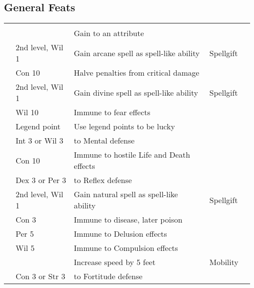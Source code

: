 \subsection{General Feats}
\begin{longtabuwrapper}
    \begin{longtabu}{>{\lcol}p{10em} >{\lcol}p{15em} >{\lcol}X >{\lcol}p{8em} >{\lcol}p{3em}}
         &  &  &  &  \\
         & \x & Gain  to an attribute           & \x &  \\
         & 2nd level, Wil 1 & Gain arcane spell as spell-like ability & Spellgift &  \\
         & Con 10 & Halve penalties from critical damage         & \x &  \\
         & 2nd level, Wil 1 & Gain divine spell as spell-like ability & Spellgift &  \\
         & Wil 10 & Immune to fear effects                      & \x &  \\
         & Legend point & Use legend points to be lucky  & \x &  \\
         & Int 3 or Wil 3 &  to Mental defense           & \x &  \\
         & Con 10 & Immune to hostile Life and Death effects   & \x &  \\
         & Dex 3 or Per 3 &   to Reflex defense & \x &  \\
         & 2nd level, Wil 1 & Gain natural spell as spell-like ability & Spellgift &  \\
         & Con 3 & Immune to disease, later poison        & \x &  \\
         & Per 5 & Immune to Delusion effects          & \x &  \\
         & Wil 5 & Immune to Compulsion effects                 & \x &  \\
         & \x & Increase speed by 5 feet                           & Mobility &  \\
         & Con 3 or Str 3 &  to Fortitude defense        & \x &  \\


\end{longtabu}
\end{longtabuwrapper}
